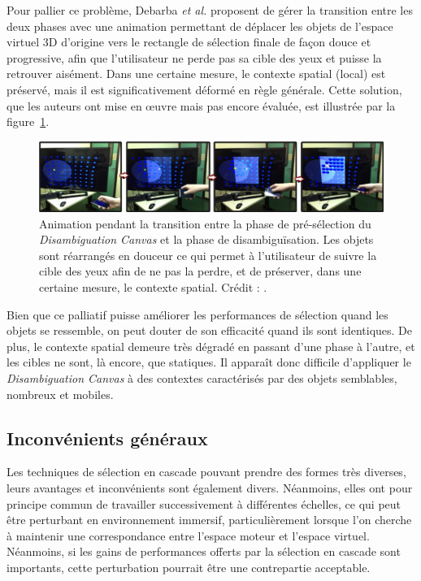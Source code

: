 	Pour pallier ce problème, Debarba \emph{et al.} proposent de gérer la transition entre les deux phases avec une animation permettant de déplacer les objets de l'espace virtuel 3D d'origine vers le rectangle de sélection finale de façon \og douce \fg{} et progressive, afin que l'utilisateur ne perde pas sa cible des yeux et puisse la retrouver aisément. Dans une certaine mesure, le contexte spatial (local) est préservé, mais il est significativement déformé en règle générale. Cette solution, que les auteurs ont mise en \oe{}uvre mais pas encore évaluée, est illustrée par la figure~\ref{fig:dCanvasContext}.
	
	\begin{figure}[!htb]
		\centering
		\includegraphics[width=\textwidth]{figures/ch2/dCanvasContext}
		\caption[\emph{Disambiguation Canvas} -- animation de transition]{Animation pendant la transition entre la phase de pré-sélection du \emph{Disambiguation Canvas} et la phase de disambiguïsation. Les objets sont réarrangés \og en douceur \fg{} ce qui permet à l'utilisateur de suivre la cible des yeux afin de ne pas la perdre, et de préserver, dans une certaine mesure, le contexte spatial. Crédit : \cite{debarba2013disambiguation}.}
		\label{fig:dCanvasContext}
	\end{figure}
	
	Bien que ce palliatif puisse améliorer les performances de sélection quand les objets se ressemble, on peut douter de son efficacité quand ils sont identiques. De plus, le contexte spatial demeure très dégradé en passant d'une phase à l'autre, et les cibles ne sont, là encore, que statiques. Il apparaît donc difficile d'appliquer le \emph{Disambiguation Canvas} à des contextes caractérisés par des objets semblables, nombreux et mobiles.
	
	\subsection{Inconvénients généraux}
	Les techniques de sélection en cascade pouvant prendre des formes très diverses, leurs avantages et inconvénients sont également divers. Néanmoins, elles ont pour principe commun de travailler successivement à différentes échelles, ce qui peut être perturbant en environnement immersif, particulièrement lorsque l'on cherche à maintenir une correspondance entre l'espace moteur et l'espace virtuel. Néanmoins, si les gains de performances offerts par la sélection en cascade sont importants, cette perturbation pourrait être une contrepartie acceptable.
	
